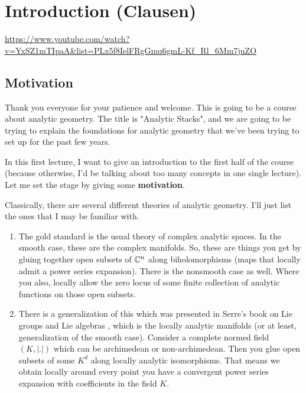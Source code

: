 
\section{\ufs Introduction (Clausen)}

\url{https://www.youtube.com/watch?v=YxSZ1mTIpaA&list=PLx5f8IelFRgGmu6gmL-Kf_Rl_6Mm7juZO}
\renewcommand{\yt}[2]{\href{https://www.youtube.com/watch?v=YxSZ1mTIpaA&list=PLx5f8IelFRgGmu6gmL-Kf_Rl_6Mm7juZO&t=#1}{#2}}
\vspace{1em}



\subsection{Motivation}

Thank you everyone for your patience and welcome. This is going to be a course about analytic geometry. The title is "Analytic Stacks", and we are going to be trying to explain the foundations for analytic geometry that we've been trying to set up for the past few years. 

In this first lecture, I want to give an introduction to the first half of the course (because otherwise, I'd be talking about too many concepts in one single lecture). Let me set the stage by giving some \textbf{motivation}.

Classically, there are several different theories of analytic geometry. I'll just list the ones that I may be familiar with. 

\begin{enumerate}
    \item The gold standard is the usual theory of complex analytic spaces. In the smooth case, these are the complex manifolds. So, these are things you get by gluing together open subsets of $\Bbb{C}^{n}$ along biholomorphisms (maps that locally admit a power series expansion). There is the nonsmooth case as well. Where you also, locally allow the zero locus of some finite collection of analytic functions on those open subsets.


    \item There is a generalization of this which was presented in Serre's book on Lie groups and Lie algebras \citeme{}, which is the locally analytic manifolds (or at least, generalization of the smooth case). Consider a complete normed field $(K, |.|)$ which can be archimedean or non-archimedean. Then you glue open subsets of some $K^d$ along locally analytic isomorphisms. That means we obtain locally around every point you have a convergent power series expansion with coefficients in the field $K$. 
\end{enumerate}
 



